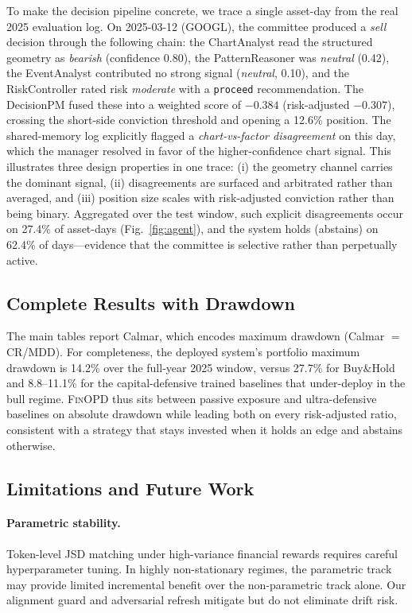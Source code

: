 To make the decision pipeline concrete, we trace a single asset-day from the real
2025 evaluation log. On 2025-03-12 (GOOGL), the committee produced a
\emph{sell} decision through the following chain: the ChartAnalyst read the
structured geometry as \emph{bearish} (confidence 0.80), the PatternReasoner was
\emph{neutral} (0.42), the EventAnalyst contributed no strong signal
(\emph{neutral}, 0.10), and the RiskController rated risk \emph{moderate} with a
\texttt{proceed} recommendation. The DecisionPM fused these into a weighted score
of $-0.384$ (risk-adjusted $-0.307$), crossing the short-side conviction threshold
and opening a 12.6\% position. The shared-memory log explicitly flagged a
\emph{chart-vs-factor disagreement} on this day, which the manager resolved in
favor of the higher-confidence chart signal. This illustrates three design
properties in one trace: (i) the geometry channel carries the dominant signal,
(ii) disagreements are surfaced and arbitrated rather than averaged, and (iii)
position size scales with risk-adjusted conviction rather than being binary.
Aggregated over the test window, such explicit disagreements occur on 27.4\% of
asset-days (Fig.~\ref{fig:agent}), and the system holds (abstains) on 62.4\% of
days---evidence that the committee is selective rather than perpetually active.

\subsection{Complete Results with Drawdown}
\label{sec:full_results}

The main tables report Calmar, which encodes maximum drawdown (Calmar $=$ CR/MDD).
For completeness, the deployed system's portfolio maximum drawdown is 14.2\% over
the full-year 2025 window, versus 27.7\% for Buy\&Hold and 8.8--11.1\% for the
capital-defensive trained baselines that under-deploy in the bull regime.
\textsc{FinOPD} thus sits between passive exposure and ultra-defensive baselines
on absolute drawdown while leading both on every risk-adjusted ratio, consistent
with a strategy that stays invested when it holds an edge and abstains otherwise.

\subsection{Limitations and Future Work}
\label{sec:limitations}

\paragraph{Parametric stability.} Token-level JSD matching under high-variance financial rewards requires careful hyperparameter tuning. In highly non-stationary regimes, the parametric track may provide limited incremental benefit over the non-parametric track alone. Our alignment guard and adversarial refresh mitigate but do not eliminate drift risk.

